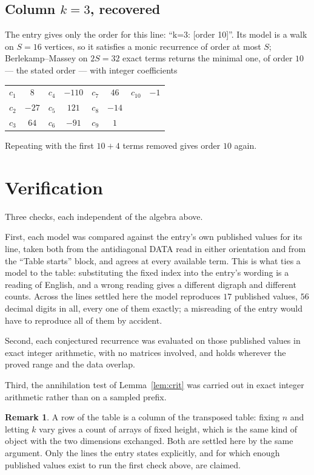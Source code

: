 \documentclass[11pt,a4paper]{article}
\theoremstyle{plain}
\theoremstyle{definition}
\newtheorem{remark}[theorem]{Remark}
\begin{document}
\subsection*{Column $k=3$, recovered}
The entry gives only the order for this line: ``k=3: [order 10]''. Its model is a walk on
$S=16$ vertices, so it satisfies a monic recurrence of order at most $S$;
Berlekamp--Massey on $2S=32$ exact terms returns the minimal one, of order
$10$ --- the stated order --- with integer coefficients
\begin{center}\small\begin{tabular}{cccccccc}
$c_{1}$ & $8$ & $c_{4}$ & $-110$ & $c_{7}$ & $46$ & $c_{10}$ & $-1$ \\
$c_{2}$ & $-27$ & $c_{5}$ & $121$ & $c_{8}$ & $-14$ &  &  \\
$c_{3}$ & $64$ & $c_{6}$ & $-91$ & $c_{9}$ & $1$ &  &  \\
\end{tabular}\end{center}
Repeating with the first $10+4$ terms removed gives order $10$ again.

\section{Verification}

Three checks, each independent of the algebra above.

First, each model was compared against the entry's own published values for its line, taken
both from the antidiagonal DATA read in either orientation and from the ``Table starts''
block, and agrees at every available term. This is what ties a model to the table:
substituting the fixed index into the entry's wording is a reading of English, and a wrong
reading gives a different digraph and different counts. Across the lines settled here the
model reproduces $17$ published values, $56$ decimal digits in all, every one of
them exactly; a misreading of the entry would have to reproduce all of them by accident.

Second, each conjectured recurrence was evaluated on those published values in exact
integer arithmetic, with no matrices involved, and holds wherever the proved range and the
data overlap.

Third, the annihilation test of Lemma~\ref{lem:crit} was carried out in exact integer
arithmetic rather than on a sampled prefix.

\begin{remark}
A row of the table is a column of the transposed table: fixing $n$ and letting $k$ vary gives a
count of arrays of fixed height, which is the same kind of object with the two dimensions
exchanged. Both are settled here by the same argument. Only the lines the entry states
explicitly, and for which enough published values exist to run the first check above, are
claimed.
\end{remark}
\end{document}
